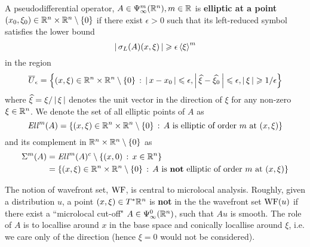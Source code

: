 \documentclass{article}
\begin{document}
\begin{fdefinition}
    A pseudodifferential operator, $A \in \Psi^m_\infty(\R^n), m \in \R$ is \textbf{elliptic at a point} $(x_0, \xi_0) \in \R^n \times \R^n \setminus \set{0}$ if there exist $\epsilon > 0$ such that its left-reduced symbol satisfies the lower bound
    \[
    \abs{\sigma_L(A)(x, \xi)} \geq \epsilon \sym[\xi]^m
    \]
    in the region
    \[
    \overline{U}_\epsilon = \set{(x, \xi) \in \R^n \times \R^n \setminus \set{0} \wh \abs{x - x_0} \leq \epsilon, \abs{\widehat{\xi} - \widehat{\xi_0}} \leq \epsilon, \abs{\xi} \geq 1/\epsilon}
    \]
    where $\widehat{\xi} = \xi / \abs{\xi}$ denotes the unit vector in the direction of $\xi$ for any non-zero $\xi \in \R^n$. We denote the set of all elliptic points of $A$ as 
    \[
    \Ell^m(A) = \set{(x, \xi) \in \R^n \times \R^n \setminus \set{0} \wh A \text{  is elliptic of order $m$ at } (x, \xi)}
    \]
    and its complement in $\R^n \times \R^n \setminus \set{0}$ as 
    \begin{align*}
    \Char^m(A) 
    &= \Ell^m(A)^c \setminus \set{(x, 0)\wh x \in \R^n} \\
    &= \set{(x, \xi) \in \R^n \times \R^n \setminus \set{0} \wh A \text{  is \textbf{not} elliptic of order $m$ at } (x, \xi)}
    \end{align*}
\end{fdefinition}

The notion of wavefront set, $\WF$,  is central to microlocal analysis. Roughly, given a distribution $u$, a point $(x, \xi) \in T^*\R^n$ is \textbf{not} in the the wavefront set $\WF(u)$ if there exist a ``microlocal cut-off" $A \in \Psi^{0}_{\infty}(\R^n)$, 
such that $A u $ is smooth. The role of $A$ is to locallise around $x$ in the base space and conically locallise around $\xi$, i.e. we care only of the direction (hence $\xi = 0$ would not be considered). 
\begin{center}
\end{center}
\end{document}
